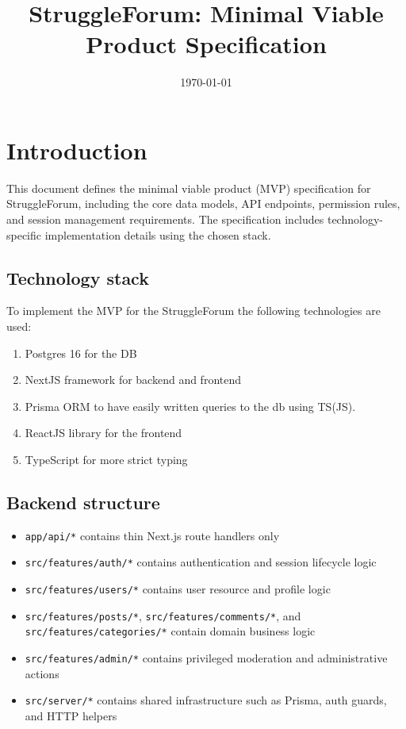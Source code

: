 \documentclass[11pt,a4paper]{article}
\title{StruggleForum: Minimal Viable Product Specification}
\author{}
\date{\today}
\begin{document}
\maketitle

\tableofcontents
\newpage

\section{Introduction}
This document defines the minimal viable product (MVP) specification for StruggleForum, including the core data models, API endpoints, permission rules, and session management requirements. The specification includes technology-specific implementation details using the chosen stack.

\subsection{Technology stack}
To implement the MVP for the StruggleForum the following technologies are used:
\begin{enumerate}
  \item Postgres 16 for the DB
  \item NextJS framework for backend and frontend
  \item Prisma ORM to have easily written queries to the db using TS(JS).
  \item ReactJS library for the frontend
  \item TypeScript for more strict typing
\end{enumerate}

\subsection{Backend structure}

\begin{itemize}
    \item \texttt{app/api/*} contains thin Next.js route handlers only
    \item \texttt{src/features/auth/*} contains authentication and session lifecycle logic
    \item \texttt{src/features/users/*} contains user resource and profile logic
    \item \texttt{src/features/posts/*}, \texttt{src/features/comments/*}, and \texttt{src/features/categories/*} contain domain business logic
    \item \texttt{src/features/admin/*} contains privileged moderation and administrative actions
    \item \texttt{src/server/*} contains shared infrastructure such as Prisma, auth guards, and HTTP helpers
\end{itemize}
\end{document}
